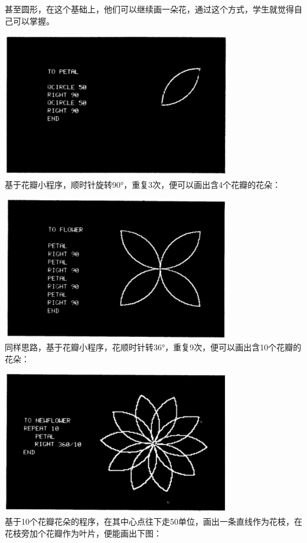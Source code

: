 甚至圆形，在这个基础上，他们可以继续画一朵花，通过这个方式，学生就觉得自己可以掌握。

\includegraphics[width=10cm]{mindstorm_p951.jpg}\\
基于花瓣小程序，顺时针旋转90°，重复3次，便可以画出含4个花瓣的花朵：

\includegraphics[width=10cm]{mindstorm_p952.jpg}\\
同样思路，基于花瓣小程序，花顺时针转36°，重复9次，便可以画出含10个花瓣的花朵：

\includegraphics[width=10cm]{mindstorm_p96.jpg}\\
基于10个花瓣花朵的程序，在其中心点往下走50单位，画出一条直线作为花枝，在花枝旁加个花瓣作为叶片，便能画出下图：

